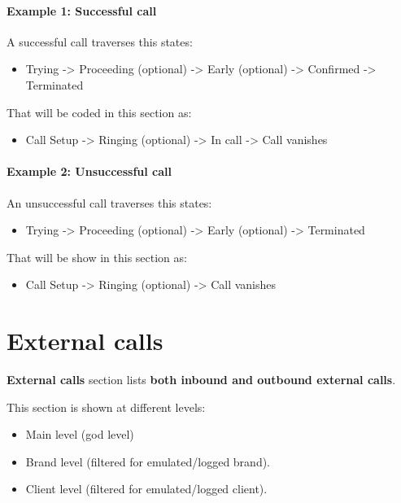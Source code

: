 \documentclass[letterpaper,10pt,spanish]{sphinxmanual}
\begin{document}
\paragraph{Example 1: Successful call}

A successful call traverses this states:
\begin{itemize}
\item {} 
Trying -\textgreater{} Proceeding (optional) -\textgreater{} Early (optional) -\textgreater{} Confirmed -\textgreater{} Terminated

\end{itemize}

That will be coded in this section as:
\begin{itemize}
\item {} 
Call Setup -\textgreater{} Ringing (optional) -\textgreater{} In call -\textgreater{} Call vanishes

\end{itemize}
\paragraph{Example 2: Unsuccessful call}

An unsuccessful call traverses this states:
\begin{itemize}
\item {} 
Trying -\textgreater{} Proceeding (optional) -\textgreater{} Early (optional) -\textgreater{} Terminated

\end{itemize}

That will be show in this section as:
\begin{itemize}
\item {} 
Call Setup -\textgreater{} Ringing (optional) -\textgreater{} Call vanishes

\end{itemize}


\section{External calls}
\label{administration_portal/platform/external_calls:id1}\label{administration_portal/platform/external_calls::doc}\label{administration_portal/platform/external_calls:external-calls}
\textbf{External calls} section lists \textbf{both inbound and outbound external calls}.

This section is shown at different levels:
\begin{itemize}
\item {} 
Main level (god level)

\item {} 
Brand level (filtered for emulated/logged brand).

\item {} 
Client level (filtered for emulated/logged client).

\end{itemize}
\end{document}
